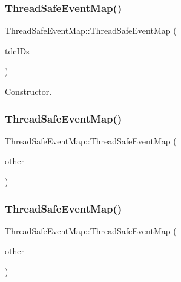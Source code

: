 \subsubsection{\texorpdfstring{Thread\+Safe\+Event\+Map()}{ThreadSafeEventMap()}\hspace{0.1cm}{\footnotesize\ttfamily [1/3]}}
{\footnotesize\ttfamily Thread\+Safe\+Event\+Map\+::\+Thread\+Safe\+Event\+Map (\begin{DoxyParamCaption}\item[{const std\+::list$<$ unsigned int $>$}]{tdc\+I\+Ds }\end{DoxyParamCaption})}



Constructor. 

\mbox{\label{class_thread_safe_event_map_a523d5bf6c632e3803e721ef3fd94e318}} 
\subsubsection{\texorpdfstring{Thread\+Safe\+Event\+Map()}{ThreadSafeEventMap()}\hspace{0.1cm}{\footnotesize\ttfamily [2/3]}}
{\footnotesize\ttfamily Thread\+Safe\+Event\+Map\+::\+Thread\+Safe\+Event\+Map (\begin{DoxyParamCaption}\item[{const \hyperlink{class_thread_safe_event_map}{Thread\+Safe\+Event\+Map} \&}]{other }\end{DoxyParamCaption})\hspace{0.3cm}{\ttfamily [delete]}}

\mbox{\label{class_thread_safe_event_map_af28959f5fbd84f00d227d10e1b37e5e5}} 
\subsubsection{\texorpdfstring{Thread\+Safe\+Event\+Map()}{ThreadSafeEventMap()}\hspace{0.1cm}{\footnotesize\ttfamily [3/3]}}
{\footnotesize\ttfamily Thread\+Safe\+Event\+Map\+::\+Thread\+Safe\+Event\+Map (\begin{DoxyParamCaption}\item[{const \hyperlink{class_thread_safe_event_map}{Thread\+Safe\+Event\+Map} \&\&}]{other }\end{DoxyParamCaption})\hspace{0.3cm}{\ttfamily [delete]}}



